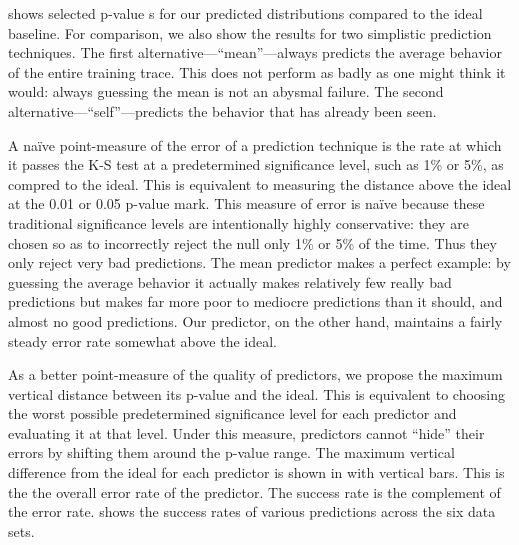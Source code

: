 \documentclass[conference]{IEEEtran}
\begin{document}
 shows selected p-value s for our predicted distributions compared to the ideal baseline.
For comparison, we also show the results for two simplistic prediction techniques.
The first alternative---``mean''---always predicts the average behavior of the entire training trace.
This does not perform as badly as one might think it would:
always guessing the mean is not an abysmal failure.
The second alternative---``self''---predicts the behavior that has already been seen.

A na\"ive point-measure of the error of a prediction technique is the rate at which it passes the K-S test at a predetermined significance level, such as 1\% or 5\%, as compred to the ideal.
This is equivalent to measuring the distance above the ideal  at the 0.01 or 0.05 p-value mark.
This measure of error is na\"ive because these traditional significance levels are intentionally highly conservative:
they are chosen so as to incorrectly reject the null only 1\% or 5\% of the time.
Thus they only reject very bad predictions.
The mean predictor makes a perfect example:
by guessing the average behavior it actually makes relatively few really bad predictions but makes far more poor to mediocre predictions than it should, and almost no good predictions.
Our predictor, on the other hand, maintains a fairly steady error rate somewhat above the ideal.

As a better point-measure of the quality of predictors, we propose the maximum vertical distance between its p-value  and the ideal.
This is equivalent to choosing the worst possible predetermined significance level for each predictor and evaluating it at that level.
Under this measure, predictors cannot ``hide'' their errors by shifting them around the p-value range.
The maximum vertical difference from the ideal for each predictor is shown in  with vertical bars.
This is the the overall error rate of the predictor.
The success rate is the complement of the error rate.
 shows the success rates of various predictions across the six data sets.
\end{document}
